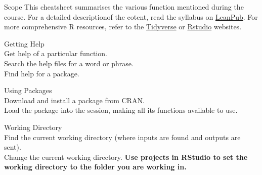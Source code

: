 
\begin{block}{Scope}
  This cheatsheet summarises the various function mentioned during the course. For a detailed descriptionof the cotent, read the syllabus on \href{https://leanpub.com/c/R4H2O}{LeanPub}. For more comprehensive R resources, refer to the \href{https://tdyverse.org}{Tidyverse} or \href{https://rstudio.com/}{Rstudio} websites. 
\end{block}

\begin{block}{Getting Help}  
  \\Get help of a particular function.\br
  \\Search the help files for a word or phrase.\br
  \\Find help for a package.
 \end{block}

\begin{block}{Using Packages}
  \\Download and install a package from CRAN.\br
  \\Load the package into the session, making all its functions available to use.\br
\end{block}

\begin{block}{Working Directory}
  \\Find the current working directory (where inputs are found and outputs are sent).\br
  \\Change the current working directory.\br
  \textbf{Use projects in RStudio to set the working directory to the folder you are working in.}
\end{block}
